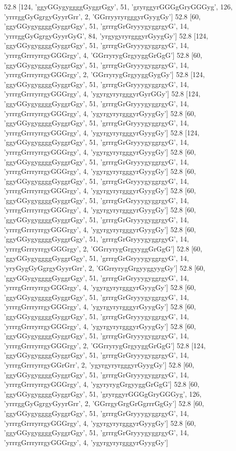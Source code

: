 52.8 [124, 'ggyGGygyggggGyggrGgy', 51, 'gryrggyrGGGgGryGGGyg', 126, 'yrrrggGyGgrgyGyyrGrr', 2, 'GGrryyryrgggyrGyygGy']
52.8 [60, 'ggyGGygyggggGyggrGgy', 51, 'grrrgGrGryyygyggrgyG', 14, 'yrrrggGyGgrgyGyyrGyG', 84, 'yrgygyryrgggyrGyygGy']
52.8 [124, 'ggyGGygyggggGyggrGgy', 51, 'grrrgGrGryyygyggrgyG', 14, 'yrrrgGrrryrrgyGGGrgy', 4, 'GGrryrygGrgyyggGrGgG']
52.8 [60, 'ggyGGygyggggGyggrGgy', 51, 'grrrgGrGryyygyggrgyG', 14, 'yrrrgGrrryrrgyGGGrgy', 2, 'GGrryrygGrgyyggGygGy']
52.8 [124, 'ggyGGygyggggGyggrGgy', 51, 'grrrgGrGryyygyggrgyG', 14, 'yrrrgGrrryrrgyGGGrgy', 4, 'ygyrgyryrgggyrGyrGGy']
52.8 [124, 'ggyGGygyggggGyggrGgy', 51, 'grrrgGrGryyygyggrgyG', 14, 'yrrrgGrrryrrgyGGGrgy', 4, 'ygyrgyryrgggyrGyygGy']
52.8 [60, 'ggyGGygyggggGyggrGgy', 51, 'grrrgGrGryyygyggrgyG', 14, 'yrrrgGrrryrrgyGGGrgy', 4, 'ygyrgyryrgggyrGyygGy']
52.8 [124, 'ggyGGygyggggGyggrGgy', 51, 'grrrgGrGryyygyggrgyG', 14, 'yrrrgGrrryrrgyGGGrgy', 4, 'ygyrgyryrgggyrGyygGy']
52.8 [60, 'ggyGGygyggggGyggrGgy', 51, 'grrrgGrGryyygyggrgyG', 14, 'yrrrgGrrryrrgyGGGrgy', 4, 'ygyrgyryrgggyrGyygGy']
52.8 [60, 'ggyGGygyggggGyggrGgy', 51, 'grrrgGrGryyygyggrgyG', 14, 'yrrrgGrrryrrgyGGGrgy', 4, 'ygyrgyryrgggyrGyygGy']
52.8 [60, 'ggyGGygyggggGyggrGgy', 51, 'grrrgGrGryyygyggrgyG', 14, 'yrrrgGrrryrrgyGGGrgy', 4, 'ygyrgyryrgggyrGyygGy']
52.8 [60, 'ggyGGygyggggGyggrGgy', 51, 'grrrgGrGryyygyggrgyG', 14, 'yrrrgGrrryrrgyGGGrgy', 4, 'ygyrgyryrgggyrGyygGy']
52.8 [60, 'ggyGGygyggggGyggrGgy', 51, 'grrrgGrGryyygyggrgyG', 14, 'yrrrgGrrryrrgyGGGrgy', 2, 'GGrryrygGrgyyggGrGgG']
52.8 [60, 'ggyGGygyggggGyggrGgy', 51, 'grrrgGrGryyygyggrgyG', 14, 'yryGygGyGgrgyGyyrGrr', 2, 'GGrryrygGrgyyggyygGy']
52.8 [60, 'ggyGGygyggggGyggrGgy', 51, 'grrrgGrGryyygyggrgyG', 14, 'yrrrgGrrryrrgyGGGrgy', 4, 'ygyrgyryrgggyrGyygGy']
52.8 [60, 'ggyGGygyggggGyggrGgy', 51, 'grrrgGrGryyygyggrgyG', 14, 'yrrrgGrrryrrgyGGGrgy', 4, 'ygyrgyryrgggyrGyygGy']
52.8 [60, 'ggyGGygyggggGyggrGgy', 51, 'grrrgGrGryyygyggrgyG', 14, 'yrrrgGrrryrrgyGGGrgy', 4, 'ygyrgyryrgggyrGyygGy']
52.8 [60, 'ggyGGygyggggGyggrGgy', 51, 'grrrgGrGryyygyggrgyG', 14, 'yrrrgGrrryrrgyGGGrgy', 2, 'GGrryrygGrgyyggGrGgG']
52.8 [124, 'ggyGGygyggggGyggrGgy', 51, 'grrrgGrGryyygyggrgyG', 14, 'yrrrgGrrryrrgyGGrGrr', 2, 'ygyrgyryrgggyrGyygGy']
52.8 [60, 'ggyGGygyggggGyggrGgy', 51, 'grrrgGrGryyygyggrgyG', 14, 'yrrrgGrrryrrgyGGGrgy', 4, 'ygyryrygGrgyyggGrGgG']
52.8 [60, 'ggyGGygyggggGyggrGgy', 51, 'gryrggyrGGGgGryGGGyg', 126, 'yrrrggGyGgrgyGyyrGrr', 2, 'GGrrgyGrgGrGgrrrGgGy']
52.8 [60, 'ggyGGygyggggGyggrGgy', 51, 'grrrgGrGryyygyggrgyG', 14, 'yrrrgGrrryrrgyGGGrgy', 4, 'ygyrgyryrgggyrGyygGy']
52.8 [60, 'ggyGGygyggggGyggrGgy', 51, 'grrrgGrGryyygyggrgyG', 14, 'yrrrgGrrryrrgyGGGrgy', 4, 'ygyrgyryrgggyrGyygGy']
